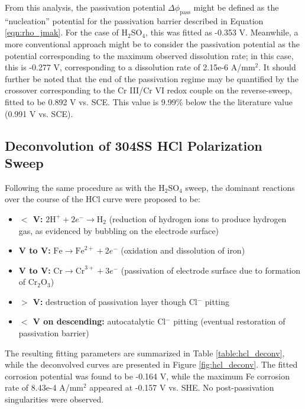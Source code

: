 From this analysis, the passivation potential $\Delta \phi_{\text{pass}}$ might be defined as the ``nucleation'' potential for the passivation barrier described in Equation \ref{eqn:rho_jmak}.  For the case of H$_2$SO$_4$, this was fitted as -0.353 V.  Meanwhile, a more conventional approach might be to consider the passivation potential as the potential corresponding to the maximum observed dissolution rate; in this case, this is -0.277 V, corresponding to a dissolution rate of 2.15e-6 A/mm$^2$.  It should further be noted that the end of the passivation regime may be quantified by the crossover corresponding to the Cr III/Cr VI redox couple on the reverse-sweep, fitted to be 0.892 V vs. SCE.  This value is 9.99\% below the the literature value (0.991 V vs. SCE).

\subsection{Deconvolution of 304SS HCl Polarization Sweep}

Following the same procedure as with the H$_2$SO$_4$ sweep, the dominant reactions over the course of the HCl curve were proposed to be:

\singlespacing
\begin{itemize}
	\item \textbf{$<$  V:} $2 \text{H}^+ + 2 e^- \rightarrow \text{H}_2$ (reduction of hydrogen ions to produce hydrogen gas, as evidenced by bubbling on the electrode surface)
	\item \textbf{ V to  V:} $\text{Fe} \rightarrow \text{Fe}^{2+} + 2 e^-$ (oxidation and dissolution of iron)
	\item\textbf{ V to  V:} $\text{Cr} \rightarrow \text{Cr}^{3+} + 3 e^-$ (passivation of electrode surface due to formation of Cr$_2$O$_3$)
	\item\textbf{$>$  V:} destruction of passivation layer though Cl$^-$ pitting
	\item\textbf{$<$  V on descending:} autocatalytic Cl$^-$ pitting (eventual restoration of passivation barrier)
\end{itemize}
\doublespacing

The resulting fitting parameters are summarized in Table \ref{table:hcl_deconv}, while the deconvolved curves are presented in Figure \ref{fig:hcl_deconv}.  The fitted corrosion potential was found to be -0.164 V, while the maximum Fe corrosion rate of 8.43e-4 A/mm$^2$ appeared at -0.157 V vs. SHE.  No post-passivation singularities were observed.

